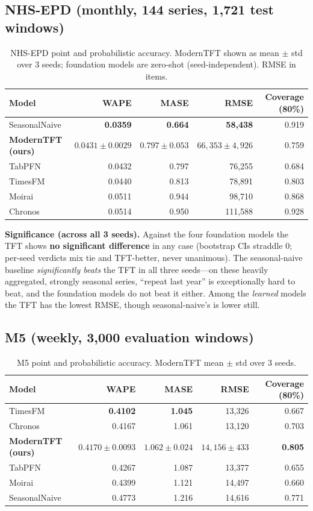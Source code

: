 \documentclass[11pt]{article}
\begin{document}
\subsection{NHS-EPD (monthly, 144 series, 1{,}721 test windows)}
\begin{table}[h]
\centering
\caption{NHS-EPD point and probabilistic accuracy. ModernTFT shown as mean $\pm$ std over
3 seeds; foundation models are zero-shot (seed-independent). RMSE in items.}
\begin{tabular}{lrrrr}
\toprule
Model & WAPE & MASE & RMSE & Coverage (80\%) \\
\midrule
SeasonalNaive & \textbf{0.0359} & \textbf{0.664} & \textbf{58{,}438} & 0.919 \\
\textbf{ModernTFT (ours)} & $0.0431 \pm 0.0029$ & $0.797 \pm 0.053$ & $66{,}353 \pm 4{,}926$ & 0.759 \\
TabPFN  & 0.0432 & 0.797 & 76{,}255 & 0.684 \\
TimesFM & 0.0440 & 0.813 & 78{,}891 & 0.803 \\
Moirai  & 0.0511 & 0.944 & 98{,}710 & 0.868 \\
Chronos & 0.0514 & 0.950 & 111{,}588 & 0.928 \\
\bottomrule
\end{tabular}
\end{table}

\noindent\textbf{Significance (across all 3 seeds).} Against the four foundation models the
TFT shows \textbf{no significant difference} in any case (bootstrap CIs straddle 0; per-seed
verdicts mix tie and TFT-better, never unanimous). The seasonal-naive baseline
\emph{significantly beats} the TFT in all three seeds---on these heavily aggregated, strongly
seasonal series, ``repeat last year'' is exceptionally hard to beat, and the foundation
models do not beat it either. Among the \emph{learned} models the TFT has the lowest RMSE,
though seasonal-naive's is lower still.

\subsection{M5 (weekly, 3{,}000 evaluation windows)}
\begin{table}[h]
\centering
\caption{M5 point and probabilistic accuracy. ModernTFT mean $\pm$ std over 3 seeds.}
\begin{tabular}{lrrrr}
\toprule
Model & WAPE & MASE & RMSE & Coverage (80\%) \\
\midrule
TimesFM & \textbf{0.4102} & \textbf{1.045} & 13{,}326 & 0.667 \\
Chronos & 0.4167 & 1.061 & 13{,}120 & 0.703 \\
\textbf{ModernTFT (ours)} & $0.4170 \pm 0.0093$ & $1.062 \pm 0.024$ & $14{,}156 \pm 433$ & \textbf{0.805} \\
TabPFN  & 0.4267 & 1.087 & 13{,}377 & 0.655 \\
Moirai  & 0.4399 & 1.121 & 14{,}497 & 0.660 \\
SeasonalNaive & 0.4773 & 1.216 & 14{,}616 & 0.771 \\
\bottomrule
\end{tabular}
\end{table}
\end{document}

